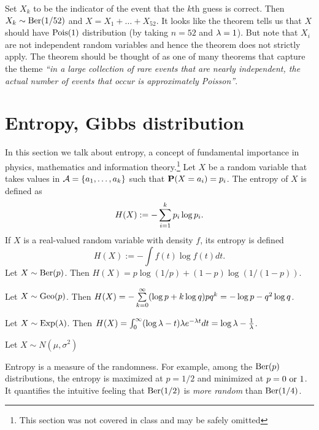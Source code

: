 \documentclass[preprint,  11pt]{amsart}
\def\sig{{\sigma}}
\renewcommand{\benu}{\begin{enumerate}\setlength\itemsep{6pt}}
\begin{document}
Set $X_{k}$ to be the indicator of the event that the $k$th guess is correct. Then $X_{k}\sim \mb{Ber}(1/52)$ and $X=X_{1}+\ldots +X_{52}$. It looks like the theorem tells us that $X$ should have $\mb{Pois}(1)$ distribution (by taking $n=52$ and $\lam=1$). But note that $X_{i}$ are not independent random variables and hence the theorem does not strictly apply. The theorem should be thought of as one of many theorems that capture the theme {\em ``in a large collection of rare events that are nearly independent, the actual number of events that occur is approximately Poisson''}.


{\color{Sepia} \small
\section{Entropy, Gibbs distribution}
In this section we talk about entropy, a concept of fundamental importance in physics, mathematics and information theory.\footnote{This section was not covered in class and may be safely omitted}
\bdefn Let $X$ be a random variable that takes values in $\AA=\{a_{1},\ldots ,a_{k}\}$ such that $\P(X=a_{i})=p_{i}$. The entropy of $X$ is defined as 
$$
H(X) := -\summ_{i=1}^{k} p_{i}\log p_{i}.
$$ 
If $X$ is a real-valued random variable with density $f$, its entropy is defined
$$
H(X):= -\int f(t)\log f(t) dt.
$$ 
\edefn
\beg Let $X\sim\mb{Ber}(p)$. Then $H(X)=p\log(1/p) +(1-p)\log(1/(1-p))$.
\eeg

\beg Let $X\sim \mb{Geo}(p)$. Then $H(X)=-\summ_{k=0}^{\infty}(\log p+k\log q) pq^{k} = -\log p -q^{2}\log q$. 
\eeg

\beg Let $X\sim \mb{Exp}(\lam)$. Then $H(X)=\int_{0}^{\infty} (\log \lam -t)\lam e^{-\lam t}dt=\log \lam -\frac{1}{\lam}$.
\eeg

\beg Let $X\sim N(\mu,\sig^{2})$
\eeg

Entropy is a measure of the randomness. For example, among the $\mb{Ber}(p)$ distributions, the entropy is maximized at $p=1/2$ and minimized at $p=0\mb{ or }1$. It quantifies the intuitive feeling that $\mb{Ber}(1/2)$ is {\em more random} than $\mb{Ber}(1/4)$. 


}
\end{document}
